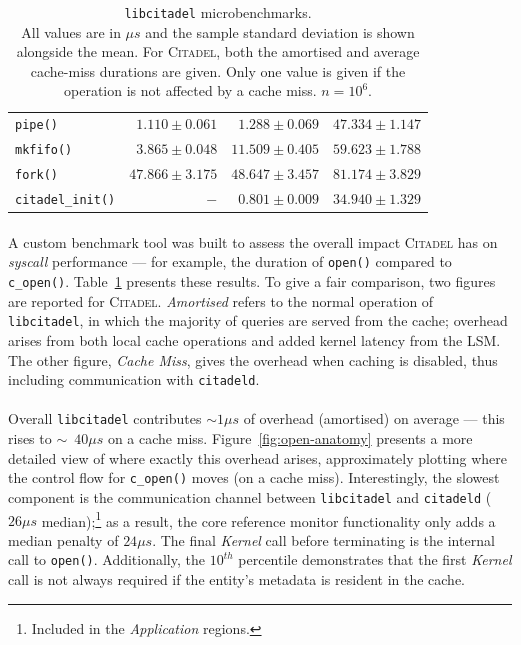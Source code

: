 \begin{table}
\begin{tabular}{l@{\hskip 0.15in} r@{\hskip 0.6in} r@{\hskip 0.35in} r}
        \midrule 
        \texttt{pipe()} & $1.110\pm0.061$ & $1.288\pm0.069$ & $47.334\pm1.147$ \\
        \texttt{mkfifo()} & $3.865\pm0.048$ & $11.509\pm0.405$ & $59.623\pm1.788$ \\

        \midrule 
        \texttt{fork()} & $47.866\pm3.175$ & $48.647\pm3.457$ & $81.174\pm3.829$ \\
        \texttt{citadel\_init()} & $-$ & $0.801\pm0.009$ & $34.940\pm1.329$ \\
        \bottomrule
    \end{tabular}
    \vspace{5mm}
    \captionsetup{justification=centering}
    \caption[\texttt{libcitadel} microbenchmarks]{\texttt{libcitadel} microbenchmarks. \\ All values are in $\mu s$ and the sample standard deviation is shown alongside the mean. For \textsc{Citadel}, both the amortised and average cache-miss durations are given. Only one value is given if the operation is not affected by a cache miss. $n=10^6$.}
    \label{table:syscall-microbenchmarks}
\end{table}

\paragraph{} A custom benchmark tool was built to assess the overall impact \textsc{Citadel} has on \textit{syscall} performance --- for example, the duration of \texttt{open()} compared to \texttt{c\_open()}. Table~\ref{table:syscall-microbenchmarks} presents these results. To give a fair comparison, two figures are reported for \textsc{Citadel}. \textit{Amortised} refers to the normal operation of \texttt{libcitadel}, in which the majority of queries are served from the cache; overhead arises from both local cache operations and added kernel latency from the LSM. The other figure, \textit{Cache Miss}, gives the overhead when caching is disabled, thus including communication with \texttt{citadeld}.

\paragraph{} Overall \texttt{libcitadel} contributes $\sim{}1 \mu s$ of overhead (amortised) on average --- this rises to $\sim$~$40 \mu s$ on a cache miss. Figure~\ref{fig:open-anatomy} presents a more detailed view of where exactly this overhead arises, approximately plotting where the control flow for \texttt{c\_open()} moves (on a cache miss). Interestingly, the slowest component is the communication channel between \texttt{libcitadel} and \texttt{citadeld} ($26\mu s$ median);\footnote{Included in the \textit{Application} regions.} as a result, the core reference monitor functionality only adds a median penalty of $24\mu s$. The final \textit{Kernel} call before terminating is the internal call to \texttt{open()}. Additionally, the $10^{th}$ percentile demonstrates that the first \textit{Kernel} call is not always required if the entity's metadata is resident in the cache.

